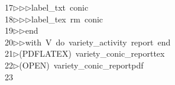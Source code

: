 \begin{tabbing}
17\>$\triangleright$\>$\triangleright$\>$\triangleright$\>label\_txt\ conic\ \\[0pt]
18\>$\triangleright$\>$\triangleright$\>$\triangleright$\>label\_tex\ rm\ conic\ \\[0pt]
19\>$\triangleright$\>$\triangleright$\>end\ \\[0pt]
20\>$\triangleright$\>$\triangleright$\>with\ V\ do\ variety\_activity\ report\ end\\[0pt]
21\>$\triangleright$\>(PDFLATEX)\ variety\_conic\_reporttex\\[0pt]
22\>$\triangleright$\>(OPEN)\ variety\_conic\_reportpdf\\[0pt]
23\>\end{tabbing}
